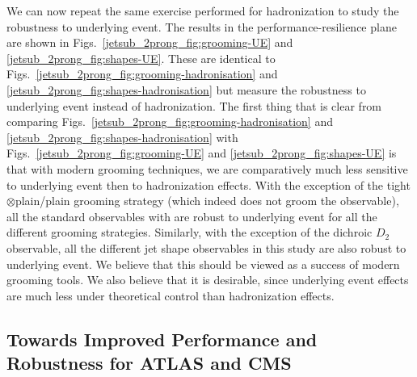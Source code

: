 \documentclass[11pt,letterpaper]{article}
\begin{document}
We can now repeat the same exercise performed for hadronization to study the robustness to underlying event.
%
The results in the performance-resilience plane are shown in Figs.~\ref{jetsub_2prong_fig:grooming-UE} and \ref{jetsub_2prong_fig:shapes-UE}.
%
These are identical to Figs.~\ref{jetsub_2prong_fig:grooming-hadronisation} and \ref{jetsub_2prong_fig:shapes-hadronisation} but measure the robustness to underlying event instead of hadronization.
%
The first thing that is clear from comparing Figs.~\ref{jetsub_2prong_fig:grooming-hadronisation} and \ref{jetsub_2prong_fig:shapes-hadronisation} with  Figs.~\ref{jetsub_2prong_fig:grooming-UE} and \ref{jetsub_2prong_fig:shapes-UE} is that with modern grooming techniques, we are comparatively much less sensitive to underlying event then to hadronization effects.
%
With the exception of the tight$\otimes$plain/plain grooming strategy (which indeed does not groom the observable), all the standard observables with are robust to underlying event for all the different grooming strategies.
%
Similarly, with the exception of the dichroic $D_2$ observable, all the different jet shape observables in this study are also robust to underlying event.
%
We believe that this should be viewed as a success of modern grooming tools.
%
We also believe that it is desirable, since underlying event effects are much less under theoretical control than hadronization effects. 




\subsection{Towards Improved Performance and Robustness for ATLAS and CMS}\label{jetsub_2prong_sec:exp_compare}
\end{document}
